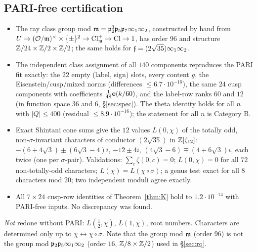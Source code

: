 \subsection{PARI-free certification}\label{app:pari}
\begin{itemize}[leftmargin=2em]
\item The ray class group mod $\mathfrak{m}=\mathfrak{p}_2^3\mathfrak{p}_5\mathfrak{p}_7\infty_1\infty_2$, constructed by hand from
$U\to(\mathcal{O}/\mathfrak{m})^\times\times\{\pm\}^2\to\mathrm{Cl}^+_{\mathfrak{m}}\to\mathrm{Cl}\to1$, has order $96$ and structure $\mathbb{Z}/24\times\mathbb{Z}/2\times\mathbb{Z}/2$; the same
holds for $\mathfrak{f}=(2\sqrt{35})\infty_1\infty_2$.
\item The independent class assignment of all $140$ components reproduces the PARI fit exactly: the $22$ empty (label, sign) slots, every
content $g$, the Eisenstein/cusp/mixed norms (differences $\le 6.7\cdot10^{-16}$), the same $24$ cusp components with coefficients
$\tfrac1{48}\mathbf{e}(k/60)$, and the label-row ranks $60$ and $12$ (in function space $36$ and $6$, \S\ref{sec:spec}). The theta identity holds for all $n$ with $|Q|\le400$ (residual
$\le8.9\cdot10^{-16}$); the statement for all $n$ is Category B.
\item Exact Shintani cone sums give the $12$ values $L(0,\chi)$ of the totally odd, non-$\sigma$-invariant characters of conductor
$(2\sqrt{35})$ in $\mathbb{Z}[\zeta_{12}]$: $-(6+4\sqrt3)\pm(6\sqrt3-4)i$, $-12\pm4i$, $(4\sqrt3-6)\mp(4+6\sqrt3)i$, each twice (one per $\sigma$-pair).
Validations: $\sum_c\zeta(0,c)=0$; $L(0,\chi)=0$ for all $72$ non-totally-odd characters; $L(\chi)=L(\chi\circ\sigma)$; a genus test exact for all
$8$ characters mod $20$; two independent moduli agree exactly.
\item All $7\times24$ cusp-row identities of Theorem~\ref{thm:K} hold to $1.2\cdot10^{-14}$ with PARI-free inputs. No discrepancy was found.
\end{itemize}
\emph{Not} redone without PARI: $L(\tfrac12,\chi)$, $L(1,\chi)$, root numbers. Characters are determined only up to $\chi\leftrightarrow\chi\circ\sigma$.
Note that the group mod $\mathfrak{m}$ (order $96$) is not the group mod $\mathfrak{p}_2\mathfrak{p}_5\infty_1\infty_2$ (order $16$, $\mathbb{Z}/8\times\mathbb{Z}/2$) used in \S\ref{sec:rq}.
